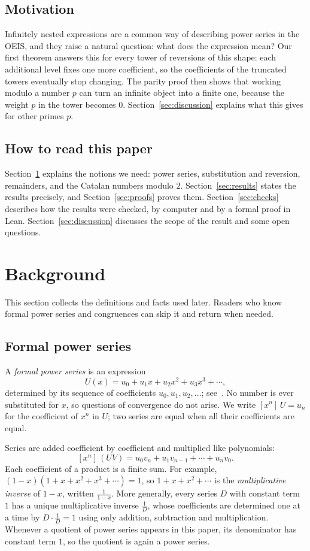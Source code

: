 \documentclass[11pt,a4paper]{article}
\theoremstyle{definition}
\theoremstyle{remark}
\newcommand{\coeff}[2]{[x^{#1}]\,#2}
\begin{document}
\subsection{Motivation}
Infinitely nested expressions are a common way of describing power series in the OEIS, and they raise a natural
question: what does the expression mean? Our first theorem answers this for every tower of reversions of this shape: each
additional level fixes one more coefficient, so the coefficients of the truncated towers eventually stop changing. The
parity proof then shows that working modulo a number $p$ can turn an infinite object into a finite one,
because the weight $p$ in the tower becomes $0$. Section~\ref{sec:discussion} explains what this gives for other primes
$p$.

\subsection{How to read this paper}
Section~\ref{sec:background} explains the notions we need: power series, substitution and reversion, remainders, and the
Catalan numbers modulo $2$. Section~\ref{sec:results} states the results precisely, and Section~\ref{sec:proofs} proves
them. Section~\ref{sec:checks} describes how the results were checked, by computer and by a formal proof in Lean.
Section~\ref{sec:discussion} discusses the scope of the result and some open questions.
\section{Background}\label{sec:background}
This section collects the definitions and facts used later. Readers who know formal power series and congruences can skip it and return when needed.
\subsection{Formal power series}
A \emph{formal power series} is an expression
\[
U(x)=u_0+u_1x+u_2x^2+u_3x^3+\cdots ,
\]
determined by its sequence of coefficients $u_0,u_1,u_2,\dots$; see~\cite{niven,stanley}. No number is ever
substituted for $x$, so questions of convergence do not arise. We write $\coeff{n}{U}=u_n$ for the coefficient of $x^n$ in $U$; two series are equal
when all their coefficients are equal.

Series are added coefficient by coefficient and multiplied like polynomials:
\[
\coeff{n}{(UV)}=u_0v_n+u_1v_{n-1}+\cdots+u_nv_0 .
\]
Each coefficient of a product is a finite sum. For example, $(1-x)(1+x+x^2+x^3+\cdots)=1$, so $1+x+x^2+\cdots$ is
the \emph{multiplicative inverse} of $1-x$, written $\frac{1}{1-x}$. More generally, every series $D$ with constant term
$1$ has a unique multiplicative inverse $\frac1D$, whose coefficients are determined one at a time by $D\cdot\frac1D=1$
using only addition, subtraction and multiplication. Whenever a quotient of power series appears in this paper, its
denominator has constant term $1$, so the quotient is again a power series.
\end{document}
